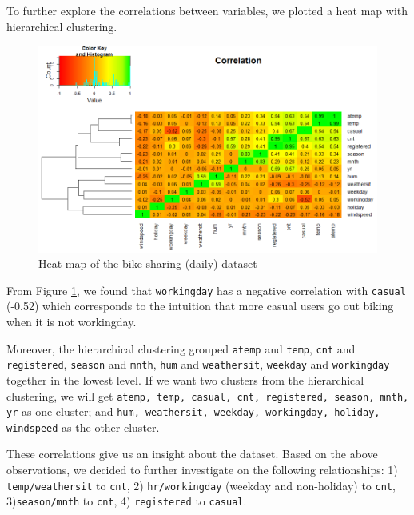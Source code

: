 \documentclass[12pt]{article}
\begin{document}
    To further explore the correlations between variables, we plotted a heat map with hierarchical clustering. 
	\begin{figure}[H]
		\includegraphics[scale=0.6]{figures/correlation.png}
		\caption{Heat map of the bike sharing (daily) dataset}
		\label{fig:correlation}
	\end{figure}
	From Figure \ref{fig:correlation}, we found that \texttt{workingday} has a negative correlation with \texttt{casual} (-0.52) which corresponds to the intuition that more casual users go out biking when it is not workingday. 
	
	Moreover, the hierarchical clustering grouped \texttt{atemp} and \texttt{temp}, \texttt{cnt} and \texttt{registered}, \texttt{season} and \texttt{mnth}, \texttt{hum} and \texttt{weathersit}, \texttt{weekday} and \texttt{workingday} together in the lowest level.  If we want two clusters from the hierarchical clustering, we will get \texttt{atemp, temp, casual, cnt, registered, season, mnth, yr} as one cluster; and \texttt{hum, weathersit, weekday, workingday, holiday, windspeed} as the other cluster.
	
	These correlations give us an insight about the dataset. 	Based on the above observations, we decided to further investigate on the following relationships: 1) \texttt{temp/weathersit} to \texttt{cnt}, 2) \texttt{hr/workingday} (weekday and non-holiday) to \texttt{cnt},  3)\texttt{season/mnth} to \texttt{cnt}, 4) \texttt{registered} to \texttt{casual}. 
	
	
\end{document}
